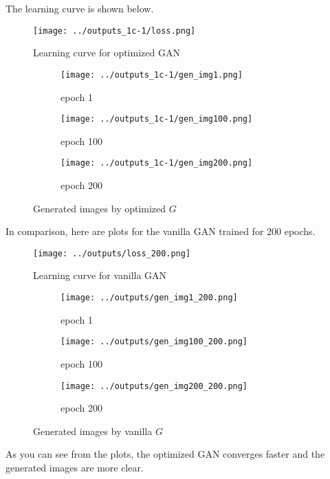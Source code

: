 \documentclass[a4paper]{article}
\theoremstyle{definition}
\newenvironment{soln}{
	\leavevmode\color{blue}\ignorespaces
}{}
\begin{document}
\begin{soln}
\begin{itemize}
 		The learning curve is shown below.
		 \begin{figure}[H]
			\centering
			\texttt{[image: ../outputs\_1c-1/loss.png]}
			\caption{Learning curve for optimized GAN}
			\label{fig:optimized_gan}
		\end{figure}
		\begin{figure}[H]
			\centering
			\begin{subfigure}[b]{0.3\textwidth}
				\centering
				\texttt{[image: ../outputs\_1c-1/gen\_img1.png]}
				\caption{epoch 1}
			\end{subfigure}
			\hfill
			\begin{subfigure}[b]{0.3\textwidth}
				\centering
				\texttt{[image: ../outputs\_1c-1/gen\_img100.png]}
				\caption{epoch 100}
			\end{subfigure}
			\hfill
			\begin{subfigure}[b]{0.3\textwidth}
				\centering
				\texttt{[image: ../outputs\_1c-1/gen\_img200.png]}
				\caption{epoch 200}
			\end{subfigure}
			\caption{Generated images by optimized $G$}
			\label{fig:optimized_gan_img}
		\end{figure}
		In comparison, here are plots for the vanilla GAN trained for 200 epochs.
		\begin{figure}[H]
			\centering
			\texttt{[image: ../outputs/loss\_200.png]}
			\caption{Learning curve for vanilla GAN}
			\label{fig:vanilla_gan_200}
		\end{figure}
		\begin{figure}[H]
			\centering
			\begin{subfigure}[b]{0.3\textwidth}
				\centering
				\texttt{[image: ../outputs/gen\_img1\_200.png]}
				\caption{epoch 1}
			\end{subfigure}
			\hfill
			\begin{subfigure}[b]{0.3\textwidth}
				\centering
				\texttt{[image: ../outputs/gen\_img100\_200.png]}
				\caption{epoch 100}
			\end{subfigure}
			\hfill
			\begin{subfigure}[b]{0.3\textwidth}
				\centering
				\texttt{[image: ../outputs/gen\_img200\_200.png]}
				\caption{epoch 200}
			\end{subfigure}
			\caption{Generated images by vanilla $G$}
			\label{fig:vanilla_gan_img_200}
		\end{figure}
		As you can see from the plots, the optimized GAN converges faster and the generated images are more clear.
		\end{itemize}
	\end{soln}
\end{document}

